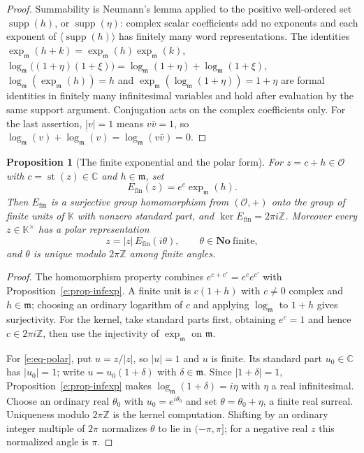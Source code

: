 \documentclass[11pt,a4paper]{article}
\numberwithin{equation}{section}
\newtheorem{proposition}[theorem]{Proposition}
\theoremstyle{definition}
\theoremstyle{remark}
\theoremstyle{plain}
\newcommand{\K}{\mathbb K}
\newcommand{\No}{\mathbf{No}}
\newcommand{\CC}{\mathbb C}
\newcommand{\ZZ}{\mathbb Z}
\newcommand{\Ov}{\mathcal O}
\newcommand{\mm}{\mathfrak m}
\DeclareMathOperator{\supp}{supp}
\DeclareMathOperator{\st}{st}
\newcommand{\Neu}[1]{\langle #1\rangle}
\newcommand{\abs}[1]{\lvert #1\rvert}
\begin{document}
\begin{proof}
Summability is Neumann's lemma applied to the positive well-ordered set
$\supp(h)$, or $\supp(\eta)$: complex scalar coefficients add no exponents
and each exponent of $\Neu{\supp(h)}$ has finitely many word
representations.  The identities
$\exp_{\mm}(h+k)=\exp_{\mm}(h)\exp_{\mm}(k)$,
$\log_{\mm}\bigl((1+\eta)(1+\xi)\bigr)=\log_{\mm}(1+\eta)+\log_{\mm}(1+\xi)$,
$\log_{\mm}(\exp_{\mm}(h))=h$ and
$\exp_{\mm}(\log_{\mm}(1+\eta))=1+\eta$ are formal identities in finitely
many infinitesimal variables and hold after evaluation by the same support
argument.  Conjugation acts on the complex coefficients only.  For the
last assertion, $\abs v=1$ means $v\bar v=1$, so
$\log_{\mm}(v)+\overline{\log_{\mm}(v)}=\log_{\mm}(v\bar v)=0$.
\end{proof}

\begin{proposition}[The finite exponential and the polar form]
\label{e:prop-polar}
For $z=c+h\in\Ov$ with $c=\st(z)\in\CC$ and $h\in\mm$, set
\[
 E_{\mathrm{fin}}(z)=e^{c}\exp_{\mm}(h).
\]
Then $E_{\mathrm{fin}}$ is a surjective group homomorphism from
$(\Ov,+)$ onto the group of finite units of $\K$ with nonzero standard
part, and $\ker E_{\mathrm{fin}}=2\pi i\ZZ$.  Moreover every $z\in\K^{\times}$
has a polar representation
\begin{equation}\label{e:eq-polar}
 z=\abs z\,E_{\mathrm{fin}}(i\theta),
 \qquad \theta\in\No\ \text{finite},
\end{equation}
and $\theta$ is unique modulo $2\pi\ZZ$ among finite angles.
\end{proposition}

\begin{proof}
The homomorphism property combines $e^{c+c'}=e^ce^{c'}$ with
Proposition~\ref{e:prop-infexp}.  A finite unit is $c(1+h)$ with $c\ne0$
complex and $h\in\mm$; choosing an ordinary logarithm of $c$ and applying
$\log_{\mm}$ to $1+h$ gives surjectivity.  For the kernel, take standard
parts first, obtaining $e^{c}=1$ and hence $c\in2\pi i\ZZ$, then use the
injectivity of $\exp_{\mm}$ on $\mm$.

For \eqref{e:eq-polar}, put $u=z/\abs z$, so $\abs u=1$ and $u$ is finite.
Its standard part $u_0\in\CC$ has $\abs{u_0}=1$; write $u=u_0(1+\delta)$
with $\delta\in\mm$.  Since $\abs{1+\delta}=1$,
Proposition~\ref{e:prop-infexp} makes $\log_{\mm}(1+\delta)=i\eta$ with
$\eta$ a real infinitesimal.  Choose an ordinary real $\theta_0$ with
$u_0=e^{i\theta_0}$ and set $\theta=\theta_0+\eta$, a finite real surreal.
Uniqueness modulo $2\pi\ZZ$ is the kernel computation.  Shifting by an
ordinary integer multiple of $2\pi$ normalizes $\theta$ to lie in
$(-\pi,\pi]$; for a negative real $z$ this normalized angle is $\pi$.
\end{proof}
\end{document}
